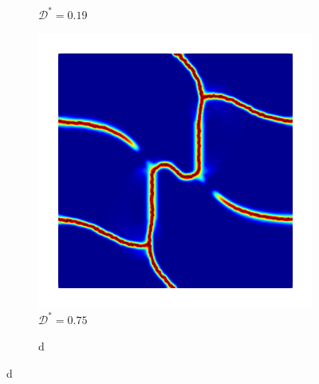 \begin{figure}[htb!]
\begin{subfigure}[b]{0.23\textwidth}
    \caption{$\mathcal{D}^* = 0.19$}
    \label{fig: Chapter4/biaxial_nosplit_2}
  \end{subfigure}
  \hspace{0.03\textwidth}
  \begin{subfigure}[b]{0.23\textwidth}
    \centering
    \includegraphics[width=\textwidth,scale=0.5]{Chapter4/figures/biaxial_nosplit_3.png}
    \caption{$\mathcal{D}^* = 0.75$}
    \label{fig: Chapter4/biaxial_nosplit_3}
  \end{subfigure}
  \begin{subfigure}[b]{0.065\textwidth}
    \centering
    \caption*{d}

\end{subfigure}
\end{figure}
